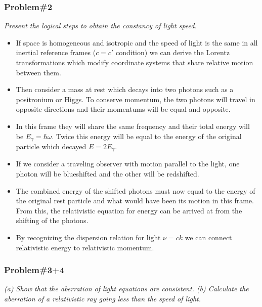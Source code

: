 \documentclass[]{article}
\numberwithin{equation}{subsection}
\begin{document}
\subsubsection*{Problem\#2}
\emph{Present the logical steps to obtain the constancy of light speed.}

\begin{itemize}
	\item If space is homogeneous and isotropic and the speed of light is the same in all inertial reference frames ($c=c'$ condition) we can derive the Lorentz transformations which modify coordinate systems that share relative motion between them.
	\item Then consider a mass at rest which decays into two photons such as a positronium or Higgs. To conserve momentum, the two photons will travel in opposite directions and their momentums will be equal and opposite.
	\item In this frame they will share the same frequency and their total energy will be $E_{\gamma}=\hbar\omega$. Twice this energy will be equal to the energy of the original particle which decayed $E=2E_{\gamma}$.
	\item If we consider a traveling observer with motion parallel to the light, one photon will be blueshifted and the other will be redshifted.
	\item The combined energy of the shifted photons must now equal to the energy of the original rest particle and what would have been its motion in this frame. From this, the relativistic equation for energy can be arrived at from the shifting of the photons.
	\item By recognizing the dispersion relation for light $\nu=ck$ we can connect relativistic energy to relativistic momentum.
	\end{itemize}
\subsubsection*{Problem\#3+4}
\emph{(a) Show that the aberration of light equations are consistent. (b) Calculate the aberration of a relativistic ray going less than the speed of light.}\\
\end{document}
